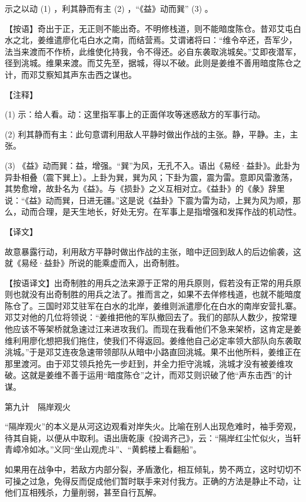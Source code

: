 \documentclass[12pt,UTF8]{ctexbook}
\begin{document}
示之以动 (1) ，利其静而有主 (2) ，“《益》动而巽” (3) 。

【按语】奇出于正，无正则不能出奇。不明修栈道，则不能暗度陈仓。昔邓艾屯白水之北，姜维遣廖化屯白水之南，而结营焉。艾谓诸将曰：“维令卒还，吾军少，法当来渡而不作桥，此维使化持我，令不得还。必自东袭取洮城矣。”艾即夜潜军，径到洮城。维果来渡。而艾先至，据城，得以不破。此则是姜维不善用暗度陈仓之计，而邓艾察知其声东击西之谋也。





【注释】


(1) 示：给人看。动：这里指军事上的正面佯攻等迷惑敌方的军事行动。

(2) 利其静而有主：此句意谓利用敌人平静时做出作战的主张。静，平静。主，主张。

(3) 《益》动而巽：益，增强。“巽”为风，无孔不入。语出《易经·益卦》。此卦为异卦相叠（震下巽上）。上卦为巽，巽为风；下卦为震，震为雷。意即风雷激荡，其势愈增，故卦名为《益》。与《损卦》之义互相对立。《益卦》的《彖》辞里说：“《益》动而巽，日进无疆。”这是说《益卦》下震为雷为动，上巽为风为顺，那么，动而合理，是天生地长，好处无穷。在军事上是指增强和发挥作战的机动性。





【译文】


故意暴露行动，利用敌方平静时做出作战的主张，暗中迂回到敌人的后边偷袭，这就《易经·益卦》所说的能乘虚而入，出奇制胜。

【按语译文】出奇制胜的用兵之法来源于正常的用兵原则，假若没有正常的用兵原则也就没有出奇制胜的用兵之法了。推而言之，如果不去佯修栈道，也就不能暗度陈仓了。三国时邓艾驻军在白水的北岸，姜维则派遣廖化在白水的南岸安营扎寨。邓艾对他的几位将领说：“姜维把他的军队撤回去了。我们的部队人数少，按常理他应该不等架桥就急速过江来进攻我们。而现在我看他们不急来架桥，这肯定是姜维利用廖化想把我们拖住，使我们不得返回。姜维他自己必定率领大部队向东袭取洮城。”于是邓艾连夜急速带领部队从暗中小路直回洮城。果不出他所料，姜维正在那里渡河。由于邓艾领兵抢先一步赶到，并全力拒守洮城，洮城才没有被姜维攻破。这就是姜维不善于运用“暗度陈仓”之计，而邓艾则识破了他“声东击西”的计谋。





第九计　隔岸观火


“隔岸观火”的本义是从河这边观看对岸失火。比喻在别人出现危难时，袖手旁观，待其自毙，以便从中取利。语出唐乾康《投谒齐己》，云：“隔岸红尘忙似火，当轩青嶂冷如冰。”义同“坐山观虎斗”、“黄鹤楼上看翻船”。

如果用在战争中，若敌方内部分裂，矛盾激化，相互倾轧，势不两立，这时切切不可操之过急，免得反而促成他们暂时联手来对付我方。正确的方法是静止不动，让他们互相残杀，力量削弱，甚至自行瓦解。
\end{document}

